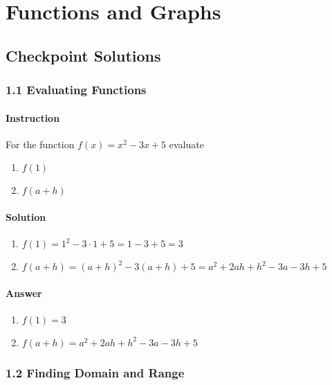 \documentclass[letterpaper, oneside]{memoir}
\begin{document}
\chapter{Functions and Graphs}

\section*{Checkpoint Solutions}

\subsection*{1.1 Evaluating Functions}

\subsubsection*{Instruction}

For the function $ f(x) = x^2 - 3x + 5 $ evaluate

\begin{enumerate}[label=(\alph*)]
  \item $ f(1) $
  \item $ f(a + h) $
\end{enumerate}

\subsubsection*{Solution}

\begin{enumerate}[label=(\alph*)]
  \item $ f(1) = 1 ^ 2 - 3 \cdot 1 + 5 = 1 - 3 + 5 = 3 $
  \item $ f(a + h) = (a + h)^2 - 3(a + h) + 5 = a^2 + 2ah + h^2 - 3a - 3h + 5 $
\end{enumerate}

\subsubsection*{Answer}

\begin{enumerate}[label=(\alph*)]
  \item $ f(1) = 3 $
  \item $ f(a + h) = a^2 + 2ah + h^2 - 3a - 3h + 5 $
\end{enumerate}

\subsection*{1.2 Finding Domain and Range}
\end{document}
